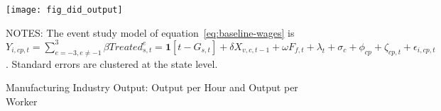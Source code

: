 \begin{figure}[H]
    \centering
    \texttt{[image: fig\_did\_output]}
    \caption{Manufacturing Industry Output: Output per Hour and Output per Worker}
    \label{fig:baseline-industry-output}
    \begin{minipage}{18cm}
        \vspace{0.05in}
        NOTES: The event study model of equation~\ref{eq:baseline-wages} is $Y_{i,cp,t} = \sum_{{e = -3},{e \neq -1}}^{3} \beta Treated_{s,t}^e = \textbf{1}[t - G_{s,t}] + \delta X_{v,c,t-1} + \omega F_{f,t} + \lambda_{t} + \sigma_{c} + \phi_{cp} + \zeta_{cp,t} + \epsilon_{i,cp,t}$. Standard errors are clustered at the state level.
    \end{minipage}
\end{figure}